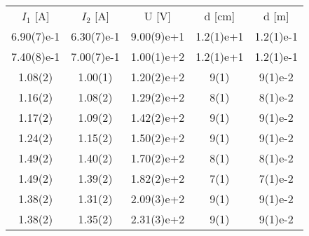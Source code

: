 \begin{tabular}{ccccc}
\hline
$I_{1}$ [A] & $I_{2}$ [A] & U [V] & d [cm] & d [m] \\
6.90(7)e-1 & 6.30(7)e-1 & 9.00(9)e+1 & 1.2(1)e+1 & 1.2(1)e-1 \\
7.40(8)e-1 & 7.00(7)e-1 & 1.00(1)e+2 & 1.2(1)e+1 & 1.2(1)e-1 \\
1.08(2) & 1.00(1) & 1.20(2)e+2 & 9(1) & 9(1)e-2 \\
1.16(2) & 1.08(2) & 1.29(2)e+2 & 8(1) & 8(1)e-2 \\
1.17(2) & 1.09(2) & 1.42(2)e+2 & 9(1) & 9(1)e-2 \\
1.24(2) & 1.15(2) & 1.50(2)e+2 & 9(1) & 9(1)e-2 \\
1.49(2) & 1.40(2) & 1.70(2)e+2 & 8(1) & 8(1)e-2 \\
1.49(2) & 1.39(2) & 1.82(2)e+2 & 7(1) & 7(1)e-2 \\
1.38(2) & 1.31(2) & 2.09(3)e+2 & 9(1) & 9(1)e-2 \\
1.38(2) & 1.35(2) & 2.31(3)e+2 & 9(1) & 9(1)e-2 \\
\hline
\end{tabular}
